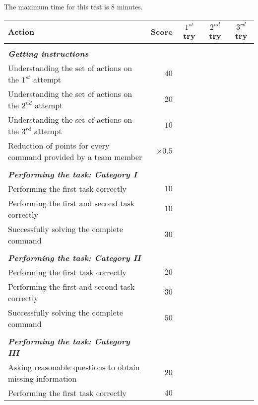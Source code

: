 The maximum time for this test is 8 minutes.

\begin{tabularx}{\textwidth}{X r c c c }

	\textbf{Action} & \textbf{Score} & \textbf{$1^{st}$ try} & \textbf{$2^{nd}$ try} & \textbf{$3^{rd}$ try} \\ \hline
	& & & & \\ 
	\textit{\textbf{Getting instructions}} \\
	Understanding the set of actions on the $1^{st}$ attempt & $40$ & \hrulefill & \hrulefill & \hrulefill \\
	Understanding the set of actions on the $2^{nd}$ attempt & $20$ & \hrulefill & \hrulefill & \hrulefill \\
	Understanding the set of actions on the $3^{rd}$ attempt & $10$ & \hrulefill & \hrulefill & \hrulefill \\
	Reduction of points for every command provided by a team member & $\times 0.5$ & \hrulefill & \hrulefill & \hrulefill \\
	& & & & \\ 
	\textit{\textbf{Performing the task: Category I}} \\
	Performing the first task correctly & $10$ & \hrulefill & \hrulefill & \hrulefill \\
	Performing the first and second task correctly & $10$ & \hrulefill & \hrulefill & \hrulefill \\
	Successfully solving the complete command & $30$ & \hrulefill & \hrulefill & \hrulefill \\
	& & & & \\ 
	\textit{\textbf{Performing the task: Category II}} \\
	Performing the first task correctly & $20$ & \hrulefill & \hrulefill & \hrulefill \\
	Performing the first and second task correctly & $30$ & \hrulefill & \hrulefill & \hrulefill \\
	Successfully solving the complete command & $50$ & \hrulefill & \hrulefill & \hrulefill \\
	& & & & \\ 
	\textit{\textbf{Performing the task: Category III}} \\
	Asking reasonable questions to obtain missing information & $20$ & \hrulefill & \hrulefill & \hrulefill \\
	Performing the first task correctly & $40$ & \hrulefill & \hrulefill & \hrulefill \\

\end{tabularx}
